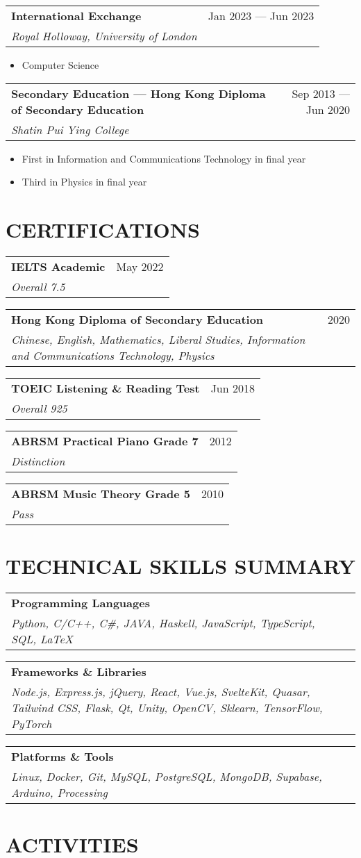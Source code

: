 \documentclass{article}
\newcommand{\jobTitle}[3]{
\vspace{0.4cm}
\begin{tabularx}{0.99\linewidth}{ X r }
    \textbf{#1} & #2\\
    \textit{#3} &
\end{tabularx}
\vspace{0.2cm}
}
\newenvironment{descitemize}
{ \begin{itemize}[leftmargin=1.4cm,,topsep=0pt]
    \setlength{\parskip}{0pt}
    \setlength{\parsep}{0pt}     }
{ \end{itemize}                  }
\begin{document}
\jobTitle
{International Exchange}
{Jan 2023 --- Jun 2023}
{Royal Holloway, University of London}
\begin{descitemize}
    \item Computer Science
\end{descitemize}

\jobTitle
{Secondary Education --- Hong Kong Diploma of Secondary Education}
{Sep 2013 --- Jun 2020}
{Shatin Pui Ying College}
\begin{descitemize}
    \item First in Information and Communications Technology in final year
    \item Third in Physics in final year
\end{descitemize}

\section{CERTIFICATIONS}

\jobTitle
{IELTS Academic}
{May 2022}
{Overall 7.5}

\jobTitle
{Hong Kong Diploma of Secondary Education}
{2020}
{Chinese, English, Mathematics, Liberal Studies, Information and Communications Technology, Physics}

\jobTitle
{TOEIC Listening \& Reading Test}
{Jun 2018}
{Overall 925}

\jobTitle
{ABRSM Practical Piano Grade 7}
{2012}
{Distinction}

\jobTitle
{ABRSM Music Theory Grade 5}
{2010}
{Pass}

\section{TECHNICAL SKILLS SUMMARY}

\jobTitle
{Programming Languages}
{}
{Python, C/C++, C\#, JAVA, Haskell, JavaScript, TypeScript, SQL, \LaTeX}

\jobTitle
{Frameworks \& Libraries}
{}
{Node.js, Express.js, jQuery, React, Vue.js, SvelteKit, Quasar, Tailwind CSS, Flask, Qt, Unity, OpenCV, Sklearn, TensorFlow, PyTorch}

\jobTitle
{Platforms \& Tools}
{}
{Linux, Docker, Git, MySQL, PostgreSQL, MongoDB, Supabase, Arduino, Processing}

\section{ACTIVITIES}
\end{document}
